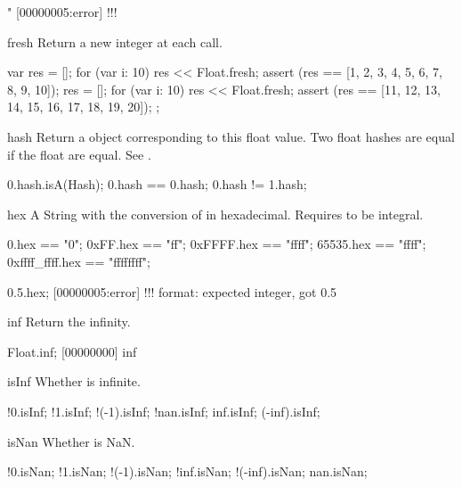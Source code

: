 \begin{urbiscriptapi}
\begin{urbiassert}
"%
[00000005:error] !!! %
\end{urbiassert}

\item[fresh]%
  Return a new integer at each call.
\begin{urbiscript}
{
  var res = [];
  for (var i: 10)
    res << Float.fresh;
  assert (res == [1, 2, 3, 4, 5, 6, 7, 8, 9, 10]);
  res = [];
  for (var i: 10)
    res << Float.fresh;
  assert (res == [11, 12, 13, 14, 15, 16, 17, 18, 19, 20]);
};
\end{urbiscript}

\item[hash] Return a  object corresponding to this float
  value. Two float hashes are equal if the float are equal. See
  .

\begin{urbiassert}
0.hash.isA(Hash);
0.hash == 0.hash;
0.hash != 1.hash;
\end{urbiassert}

\item[hex]
  A String with the conversion of \this in hexadecimal.  Requires \this to
  be integral.
\begin{urbiassert}
          0.hex == "0";
       0xFF.hex == "ff";
     0xFFFF.hex == "ffff";
      65535.hex == "ffff";
0xffff_ffff.hex == "ffffffff";

0.5.hex;
[00000005:error] !!! format: expected integer, got 0.5
\end{urbiassert}

\item[inf]
  Return the infinity.
\begin{urbiscript}
Float.inf;
[00000000] inf
\end{urbiscript}

\item[isInf]
  Whether is infinite.
\begin{urbiassert}
    !0.isInf; !1.isInf; !(-1).isInf;
  !nan.isInf;
   inf.isInf;  (-inf).isInf;
\end{urbiassert}

\item[isNan]
  Whether is NaN.
\begin{urbiassert}
     !0.isNan; !1.isNan; !(-1).isNan;
   !inf.isNan;  !(-inf).isNan;
    nan.isNan;
\end{urbiassert}


\end{urbiscriptapi}
